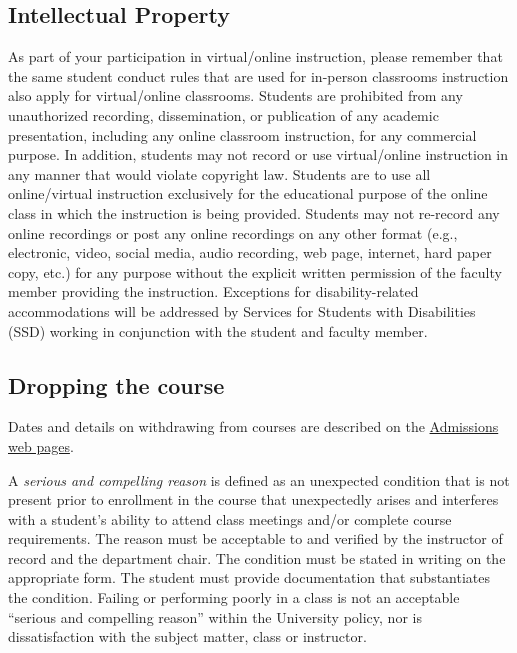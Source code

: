 \hypertarget{intellectual-property}{%
\subsection{Intellectual Property}\label{intellectual-property}}

As part of your participation in virtual/online instruction, please
remember that the same student conduct rules that are used for in-person
classrooms instruction also apply for virtual/online classrooms.
Students are prohibited from any unauthorized recording, dissemination,
or publication of any academic presentation, including any online
classroom instruction, for any commercial purpose. In addition, students
may not record or use virtual/online instruction in any manner that
would violate copyright law. Students are to use all online/virtual
instruction exclusively for the educational purpose of the online class
in which the instruction is being provided. Students may not re-record
any online recordings or post any online recordings on any other format
(e.g., electronic, video, social media, audio recording, web page,
internet, hard paper copy, etc.) for any purpose without the explicit
written permission of the faculty member providing the instruction.
Exceptions for disability-related accommodations will be addressed by
Services for Students with Disabilities (SSD) working in conjunction
with the student and faculty member.

\hypertarget{dropping-the-course}{%
\subsection{Dropping the course}\label{dropping-the-course}}

Dates and details on withdrawing from courses are described on the
\href{http://fresnostate.edu/studentaffairs/are/registration/add-drop-deadlines.html}{Admissions
web pages}.

A \emph{serious and compelling reason} is defined as an unexpected
condition that is not present prior to enrollment in the course that
unexpectedly arises and interferes with a student's ability to attend
class meetings and/or complete course requirements. The reason must be
acceptable to and verified by the instructor of record and the
department chair. The condition must be stated in writing on the
appropriate form. The student must provide documentation that
substantiates the condition. Failing or performing poorly in a class is
not an acceptable ``serious and compelling reason'' within the
University policy, nor is dissatisfaction with the subject matter, class
or instructor.

